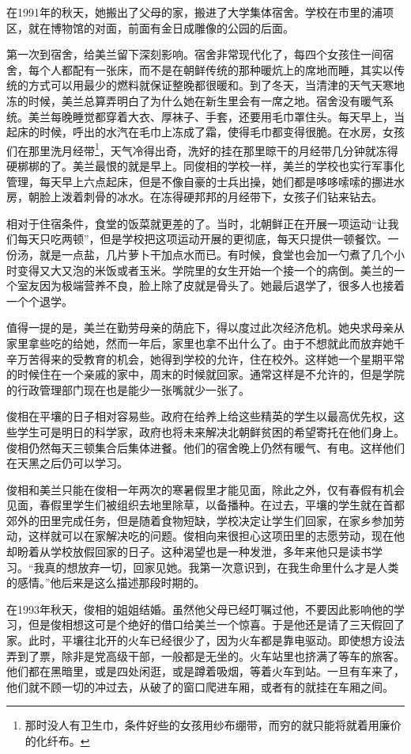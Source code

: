 在1991年的秋天，她搬出了父母的家，搬进了大学集体宿舍。学校在市里的浦项区，就在博物馆的对面，前面有金日成雕像的公园的后面。

第一次到宿舍，给美兰留下深刻影响。宿舍非常现代化了，每四个女孩住一间宿舍，每个人都配有一张床，而不是在朝鲜传统的那种暖炕上的席地而睡，其实以传统的方式可以用最少的燃料就保证整晚都很暖和。到了冬天，当清津的天气天寒地冻的时候，美兰总算弄明白了为什么她在新生里会有一席之地。宿舍没有暖气系统。美兰每晚睡觉都穿着大衣、厚袜子、手套，还要用毛巾罩住头。每天早上，当起床的时候，呼出的水汽在毛巾上冻成了霜，使得毛巾都变得很脆。在水房，女孩们在那里洗月经带\footnote{那时没人有卫生巾，条件好些的女孩用纱布绷带，而穷的就只能将就着用廉价的化纤布。}，天气冷得出奇，洗好的挂在那里晾干的月经带几分钟就冻得硬梆梆的了。美兰最恨的就是早上。同俊相的学校一样，美兰的学校也实行军事化管理，每天早上六点起床，但是不像自豪的士兵出操，她们都是哆哆嗦嗦的挪进水房，朝脸上泼着刺骨的冰水。在冻得硬邦邦的月经带下，女孩子们钻来钻去。

相对于住宿条件，食堂的饭菜就更差的了。当时，北朝鲜正在开展一项运动“让我们每天只吃两顿”，但是学校把这项运动开展的更彻底，每天只提供一顿餐饮。一份汤，就是一点盐，几片萝卜干加点水而已。有时候，食堂也会加一勺煮了几个小时变得又大又泡的米饭或者玉米。学院里的女生开始一个接一个的病倒。美兰的一个室友因为极端营养不良，脸上除了皮就是骨头了。她最后退学了，很多人也接着一个个退学。

值得一提的是，美兰在勤劳母亲的荫庇下，得以度过此次经济危机。她央求母亲从家里拿些吃的给她，然而一年后，家里也拿不出什么了。由于不想就此而放弃她千辛万苦得来的受教育的机会，她得到学校的允许，住在校外。这样她一个星期平常的时候住在一个亲戚的家中，周末的时候就回家。通常这样是不允许的，但是学院的行政管理部门现在也是能少一张嘴就少一张了。

俊相在平壤的日子相对容易些。政府在给养上给这些精英的学生以最高优先权，这些学生可是明日的科学家，政府也将未来解决北朝鲜贫困的希望寄托在他们身上。俊相仍然每天三顿集合后集体进餐。他们的宿舍晚上仍然有暖气、有电。这样他们在天黑之后仍可以学习。

俊相和美兰只能在俊相一年两次的寒暑假里才能见面，除此之外，仅有春假有机会见面，春假里学生们被组织去地里除草，以备播种。在过去，平壤的学生就在首都郊外的田里完成任务，但是随着食物短缺，学校决定让学生们回家，在家乡参加劳动，这样就可以在家解决吃的问题。俊相向来很担心这项田里的志愿劳动，现在他却盼着从学校放假回家的日子。这种渴望也是一种发泄，多年来他只是读书学习。“我真的想放弃一切，回家见她。我第一次意识到，在我生命里什么才是人类的感情。”他后来是这么描述那段时期的。

在1993年秋天，俊相的姐姐结婚。虽然他父母已经叮嘱过他，不要因此影响他的学习，但是俊相想这可是个绝好的借口给美兰一个惊喜。于是他还是请了三天假回了家。此时，平壤往北开的火车已经很少了，因为火车都是靠电驱动。即使想方设法弄到了票，除非是党高级干部，一般都是无坐的。火车站里也挤满了等车的旅客。他们都在黑暗里，或是四处闲逛，或是蹲着吸烟，等着火车到站。一旦有车来了，他们就不顾一切的冲过去，从破了的窗口爬进车厢，或者有的就挂在车厢之间。

